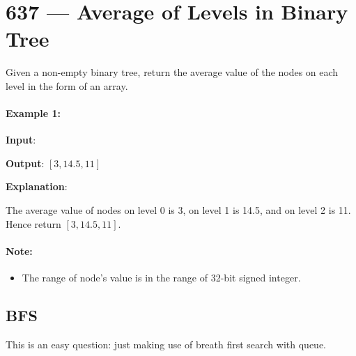 \section{637 --- Average of Levels in Binary Tree}
Given a non-empty binary tree, return the average value of the nodes on each level in the form of an array.

\paragraph{Example 1:}

\begin{flushleft}

\textbf{Input}:

\begin{figure}[H]
\end{figure}
\textbf{Output}: $[3, 14.5, 11]$

\textbf{Explanation}:

The average value of nodes on level 0 is 3,  on level 1 is 14.5, and on level 2 is 11. Hence return $[3, 14.5, 11]$.
\end{flushleft}

\paragraph{Note:}
\begin{itemize}
\item The range of node's value is in the range of 32-bit signed integer.
\end{itemize}

\subsection{BFS}
This is an easy question: just making use of breath first search with queue. 